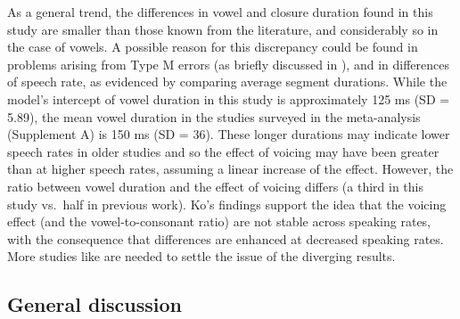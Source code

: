 \documentclass[12pt,a4paper,]{article}
\providecommand{\DIFaddtex}[1]{{\protect\color{blue}\uwave{#1}}} %
\providecommand{\DIFaddbegin}{} %
\providecommand{\DIFaddend}{} %
\providecommand{\DIFadd}[1]{\texorpdfstring{\DIFaddtex{#1}}{#1}} %
\newcommand{\DIFaddincludegraphics}[2][]{{\color{blue}\fbox{\DIFOincludegraphics[#1]{#2}}}} %
\DeclareRobustCommand{\DIFaddbegin}{\DIFOaddbegin \let\includegraphics\DIFaddincludegraphics} %
\DeclareRobustCommand{\DIFaddend}{\DIFOaddend \let\includegraphics\DIFOincludegraphics} %
\begin{document}
As a general trend, the differences in vowel and closure duration found
in this study are smaller than those known from the literature, and
considerably so in the case of vowels. A possible reason for this
discrepancy could be found in problems arising from Type M errors (as
briefly discussed in ), and in differences of speech rate,
as evidenced by comparing average segment durations. While the model's
intercept of vowel duration in this study is approximately 125 ms (SD =
5.89), the mean vowel duration in the studies surveyed in the
meta-analysis (Supplement A) is 150 ms (SD = 36). These longer durations
may indicate lower speech rates in older studies and so the effect of
voicing may have been greater \DIFaddbegin \DIFadd{there }\DIFaddend than at higher speech rates,
assuming a linear increase of the effect. However, the ratio between
vowel duration and the effect of voicing differs (a third in this study
vs.~half in previous work). Ko's findings \citeyear{ko2018} support the
idea that the voicing effect (and the vowel-to-consonant ratio) are not
stable across speaking rates, with the consequence that differences are
enhanced at decreased speaking rates. More studies like \citet{ko2018}
are needed to settle the issue of the diverging results.

\hypertarget{general-discussion}{%
\subsection{General discussion}\label{general-discussion}}

\label{s:gen-disc}
\end{document}
